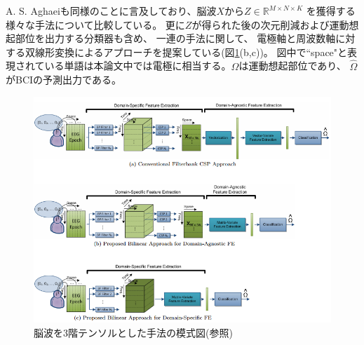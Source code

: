 A. S. Aghaei\cite{Ztfc}も同様のことに言及しており、脳波\(X\)から\(Z\in \mathbb R^{M\times N \times K}\)
を獲得する様々な手法について比較している。
更に\(Z\)が得られた後の次元削減および運動想起部位を出力する分類器も含め、
一連の手法に関して、
電極軸と周波数軸に対する双線形変換によるアプローチを提案している(図\ref{fig:fbcsp bilinear}(b,c))。
図中で``space"と表現されている単語は本論文中では電極に相当する。\(\Omega\)は運動想起部位であり、
\(\hat \Omega\)がBCIの予測出力である。
\begin{figure}
    \centering
    \includegraphics[width=14cm]{images/bilinear.png}
    \caption{脳波を3階テンソルとした手法の模式図(参照\cite{Ztfc})}
    \label{fig:fbcsp bilinear}
\end{figure}


